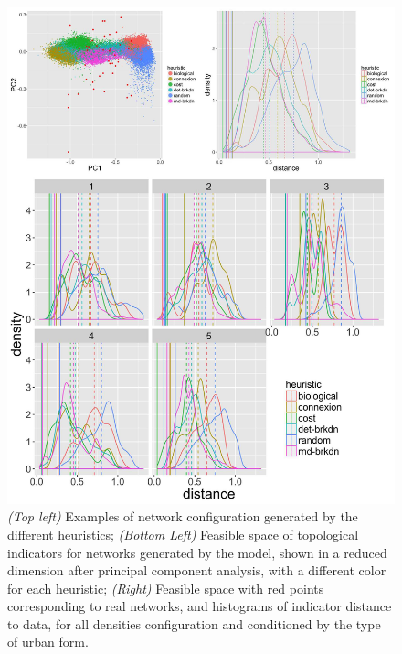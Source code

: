 \documentclass[letterpaper]{article}
\begin{document}
\begin{figure}[t]
\begin{minipage}[c]{0.55\linewidth}
\includegraphics[width=\linewidth]{figures/7-1-2-fig-networkgrowth-realdistance.jpg}
\end{minipage}
\caption{\textit{(Top left)} Examples of network configuration generated by the different heuristics; \textit{(Bottom Left)} Feasible space of topological indicators for networks generated by the model, shown in a reduced dimension after principal component analysis, with a different color for each heuristic; \textit{(Right)} Feasible space with red points corresponding to real networks, and histograms of indicator distance to data, for all densities configuration and conditioned by the type of urban form.}
\end{figure}


\footnotesize

\end{document}

